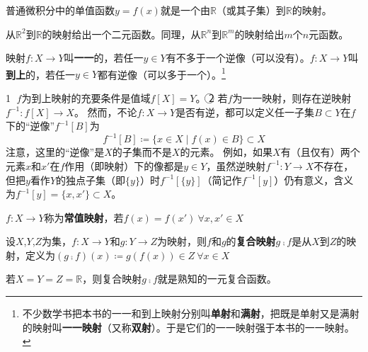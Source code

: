 \begin{example}
	普通微积分中的单值函数$y = f(x)$就是一个由$\mathbb{R}$（或其子集）到$\mathbb{R}$的映射。
\end{example}

\begin{note}
	从$\mathbb{R}^2$到$\mathbb{R}$的映射给出一个二元函数。同理，从$\mathbb{R}^n$到$\mathbb{R}^m$的映射给出$m$个$n$元函数。
\end{note}

\begin{definition}
	映射$f \colon X \to Y$叫\textbf{一一}的，若任一$y \in Y$有不多于一个逆像（可以没有）。$f \colon X \to Y$叫\textbf{到上}的，若任一$y \in Y$都有逆像（可以多于一个）。\footnote{
		不少数学书把本书的一一和到上映射分别叫\textbf{单射}和\textbf{满射}，把既是单射又是满射的映射叫\textbf{一一映射}（又称\textbf{双射}）。于是它们的一一映射强于本书的一一映射。
	}
\end{definition}

\begin{note}
	\textcircled{1} $f$为到上映射的充要条件是值域$f[X] = Y$。
	\textcircled{2} 若$f$为一一映射，则存在逆映射$f^{-1} \colon f[X] \to X$。
	然而，不论$f \colon X \to Y$是否有逆，都可以定义任一子集$B \subset Y$在$f$下的``逆像''$f^{-1}[B]$为
	$$f^{-1}[B] \coloneq \{x \in X \mid f(x) \in B\} \subset X$$
	注意，这里的``逆像''是$X$的子集而不是$X$的元素。
	例如，如果$X$有（且仅有）两个元素$x$和$x'$在$f$作用（即映射）下的像都是$y \in Y$，虽然逆映射$f^{-1} \colon Y \to X$不存在，
	但把$y$看作$Y$的独点子集（即$\{y\}$）时$f^{-1}[\{y\}]$（简记作$f^{-1}[y]$）仍有意义，含义为$f^{-1}[y] = \{x, x'\} \subset X$。
\end{note}

\begin{definition}
	$f \colon X \to Y$称为\textbf{常值映射}，若$f(x) = f(x') ~ \forall x, x' \in X$
\end{definition}

\begin{definition}
	设$X$,$Y$,$Z$为集，$f \colon X \to Y$和$g \colon Y \to Z$为映射，则$f$和$g$的\textbf{复合映射}$g \comp f$是从$X$到$Z$的映射，定义为$(g \comp f)(x) \coloneq g(f(x)) \in Z ~ \forall x \in X$
\end{definition}

\begin{note}
	若$X = Y = Z = \mathbb{R}$，则复合映射$g \comp f$就是熟知的一元复合函数。
\end{note}

